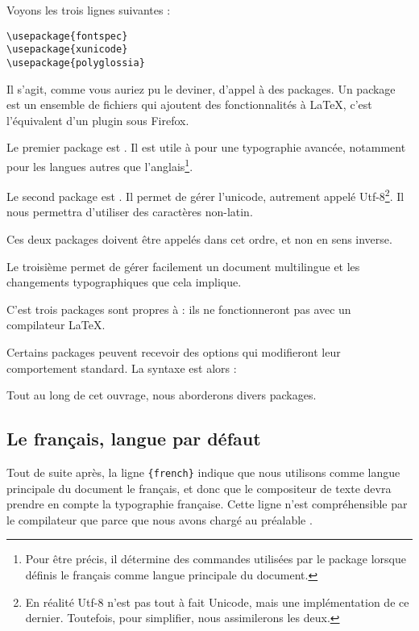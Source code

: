 Voyons les trois lignes suivantes : 
\begin{verbatim}
\usepackage{fontspec}
\usepackage{xunicode}
\usepackage{polyglossia}
\end{verbatim}

Il s'agit, comme vous auriez pu le deviner, d'appel à des packages. Un package est un ensemble de fichiers qui ajoutent des fonctionnalités à \LaTeX, c'est l'équivalent d'un plugin sous Firefox. 

Le premier package est . Il est utile à \XeLaTeX  pour une typographie avancée, notamment pour les langues autres que l'anglais\footnote{Pour être précis, il détermine des commandes utilisées par le package  lorsque définis le fran\c cais comme langue principale du document.}. 

Le second package est . Il permet de gérer l'unicode, autrement appelé Utf-8\footnote{En réalité Utf-8 n'est pas tout à fait Unicode, mais une implémentation de ce dernier. Toutefois, pour simplifier, nous assimilerons les deux.}. Il nous permettra d'utiliser des caractères non-latin.

\begin{attention}
Ces deux packages doivent être appelés dans cet ordre, et non en sens inverse.
\end{attention}

Le troisième permet de gérer facilement un document multilingue et les changements typographiques que cela implique.

C'est trois packages sont propres à \XeLaTeX  : ils ne fonctionneront pas avec un compilateur \LaTeX.

Certains packages peuvent recevoir des options qui modifieront leur comportement standard. La syntaxe est alors :


Tout au long de cet ouvrage, nous aborderons divers packages.

\subsection{Le fran\c cais, langue par défaut\label{french}}

Tout de suite après, la ligne \verb|{french}| indique que nous utilisons comme langue principale du document le fran\c cais, et donc que le compositeur de texte devra prendre en compte la typographie fran\c caise. Cette ligne n'est compréhensible par le compilateur que parce que nous avons chargé au préalable .

